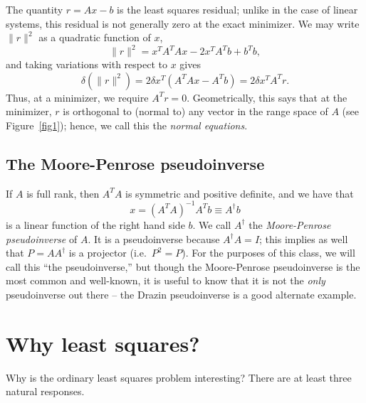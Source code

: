 \documentclass[12pt, leqno]{article} %
\begin{document}
The quantity
$r = Ax-b$ is the least squares residual; unlike in the case of
linear systems, this residual is not generally zero at the exact
minimizer.  We may write $\|r\|^2$ as a quadratic function of $x$,
\[
  \|r\|^2 = x^T A^T A x - 2 x^T A^T b + b^T b,
\]
and taking variations with respect to $x$ gives
\[
  \delta (\|r\|^2) = 2 \delta x^T (A^T A x - A^T b) = 2 \delta x^T A^T r.
\]
Thus, at a minimizer, we require $A^T r = 0$.  Geometrically, this says
that at the minimizer, $r$ is orthogonal to (normal to) any vector
in the range space of $A$ (see Figure~\ref{fig1}); hence, we call this the {\em normal equations}.

\subsection{The Moore-Penrose pseudoinverse}

If $A$ is full rank, then $A^T A$ is symmetric and positive definite,
and we have that
\[
  x = (A^T A)^{-1} A^T b \equiv A^\dagger b
\]
is a linear function of the right hand side $b$.  We call $A^\dagger$
the {\em Moore-Penrose pseudoinverse} of $A$.  It is a pseudoinverse
because $A^\dagger A = I$; this implies as well that $P = A A^\dagger$
is a projector (i.e.~$P^2 = P$).  For the purposes of this class, we
will call this ``the pseudoinverse,'' but though the Moore-Penrose
pseudoinverse is the most common and well-known, it is useful to know
that it is not the {\em only} pseudoinverse out there -- the Drazin
pseudoinverse is a good alternate example.


\section{Why least squares?}

Why is the ordinary least squares problem interesting?
There are at least three natural responses.
\end{document}
